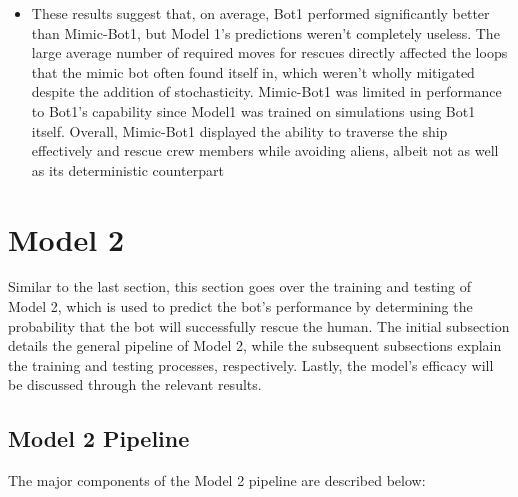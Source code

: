 \documentclass[11pt]{article}
\begin{document}
\begin{itemize}
\begin{itemize}
    \end{itemize}
    \item These results suggest that, on average, Bot1 performed significantly better than Mimic-Bot1, but Model 1's predictions weren't completely useless. The large average number of required moves for rescues directly affected the loops that the mimic bot often found itself in, which weren't wholly mitigated despite the addition of stochasticity. Mimic-Bot1 was limited in performance to Bot1's capability since Model1 was trained on simulations using Bot1 itself. Overall, Mimic-Bot1 displayed the ability to traverse the ship effectively and rescue crew members while avoiding aliens, albeit not as well as its deterministic counterpart
\end{itemize}
\section{Model 2}

Similar to the last section, this section goes over the training and testing of Model 2, which is used to predict the bot's performance by determining the probability that the bot will successfully rescue the human. The initial subsection details the general pipeline of Model 2, while the subsequent subsections explain the training and testing processes, respectively. Lastly, the model's efficacy will be discussed through the relevant results.

\subsection{Model 2 Pipeline}

The major components of the Model 2 pipeline are described below:
\end{document}
